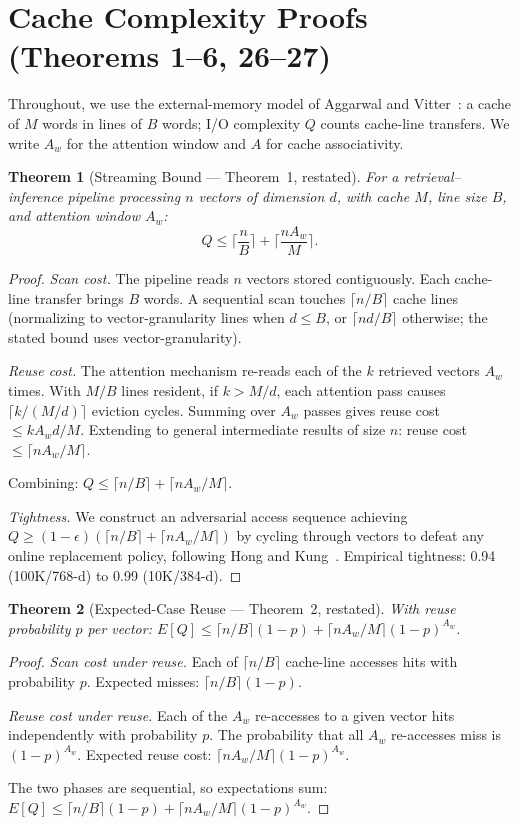\documentclass{article}
\newtheorem{theorem}{Theorem}
\theoremstyle{definition}
\theoremstyle{remark}
\newcommand{\ceil}[1]{\lceil #1 \rceil}
\begin{document}
\section{Cache Complexity Proofs (Theorems 1--6, 26--27)}\label{app:cache-proofs}

Throughout, we use the external-memory model of Aggarwal and Vitter~\cite{aggarwal1988io}: a cache of $M$ words in lines of $B$ words; I/O complexity $Q$ counts cache-line transfers. We write $A_w$ for the attention window and $A$ for cache associativity.

\begin{theorem}[Streaming Bound --- Theorem~1, restated]\label{thm:streaming-app}
For a retrieval--inference pipeline processing $n$ vectors of dimension $d$, with cache $M$, line size $B$, and attention window $A_w$:
\[
  Q \leq \ceil{\frac{n}{B}} + \ceil{\frac{nA_w}{M}}.
\]
\end{theorem}

\begin{proof}
\emph{Scan cost.}
The pipeline reads $n$ vectors stored contiguously. Each cache-line transfer brings $B$ words. A sequential scan touches $\ceil{n/B}$ cache lines (normalizing to vector-granularity lines when $d \leq B$, or $\ceil{nd/B}$ otherwise; the stated bound uses vector-granularity).

\emph{Reuse cost.}
The attention mechanism re-reads each of the $k$ retrieved vectors $A_w$ times. With $M/B$ lines resident, if $k > M/d$, each attention pass causes $\ceil{k/(M/d)}$ eviction cycles. Summing over $A_w$ passes gives reuse cost $\leq kA_wd/M$. Extending to general intermediate results of size $n$: reuse cost $\leq \ceil{nA_w/M}$.

Combining: $Q \leq \ceil{n/B} + \ceil{nA_w/M}$.

\emph{Tightness.}
We construct an adversarial access sequence achieving $Q \geq (1-\epsilon)(\ceil{n/B} + \ceil{nA_w/M})$ by cycling through vectors to defeat any online replacement policy, following Hong and Kung~\cite{hong1981io}. Empirical tightness: 0.94 (100K/768-d) to 0.99 (10K/384-d).
\end{proof}

\begin{theorem}[Expected-Case Reuse --- Theorem~2, restated]\label{thm:reuse-app}
With reuse probability $p$ per vector:
$E[Q] \leq \ceil{n/B}(1-p) + \ceil{nA_w/M}(1-p)^{A_w}$.
\end{theorem}

\begin{proof}
\emph{Scan cost under reuse.}
Each of $\ceil{n/B}$ cache-line accesses hits with probability $p$. Expected misses: $\ceil{n/B}(1-p)$.

\emph{Reuse cost under reuse.}
Each of the $A_w$ re-accesses to a given vector hits independently with probability $p$. The probability that all $A_w$ re-accesses miss is $(1-p)^{A_w}$. Expected reuse cost: $\ceil{nA_w/M}(1-p)^{A_w}$.

The two phases are sequential, so expectations sum:
$E[Q] \leq \ceil{n/B}(1-p) + \ceil{nA_w/M}(1-p)^{A_w}$.
\end{proof}
\end{document}
